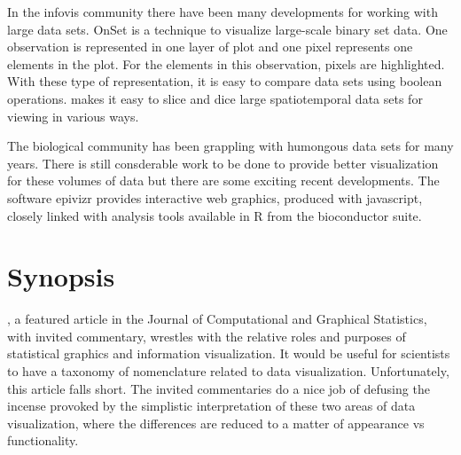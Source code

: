 \documentclass{article}
\begin{document}
In the infovis community there have been many developments for working with large data sets. OnSet\citep{sadana2014onset} is a technique to visualize large-scale binary set data. One observation is represented in one layer of plot and one pixel represents one elements in the plot. For the elements in this observation, pixels are highlighted. With these type of representation, it is easy to compare data sets using boolean operations. \citet{nanocubes} makes it easy to slice and dice large spatiotemporal data sets for viewing in various ways. 

The biological community has been grappling with humongous data sets for many years. There is still consderable work to be done to provide better visualization for these volumes of data but there are some exciting recent developments. The software epivizr \citep{epivizr} provides interactive web graphics, produced with javascript, closely linked with analysis tools available in R from the bioconductor suite. 


	
	

\section{Synopsis}

\citet{gelman2013infovis}, a featured article in the Journal of Computational and Graphical Statistics, with invited commentary, wrestles with the relative roles and purposes of statistical graphics and information visualization. It would be useful for scientists to have a taxonomy of nomenclature related to data visualization. Unfortunately, this article falls short. The invited commentaries do a nice job of defusing the incense provoked by the simplistic interpretation of these two areas of data visualization, where the differences are reduced to a matter of appearance vs functionality. 
\end{document}
